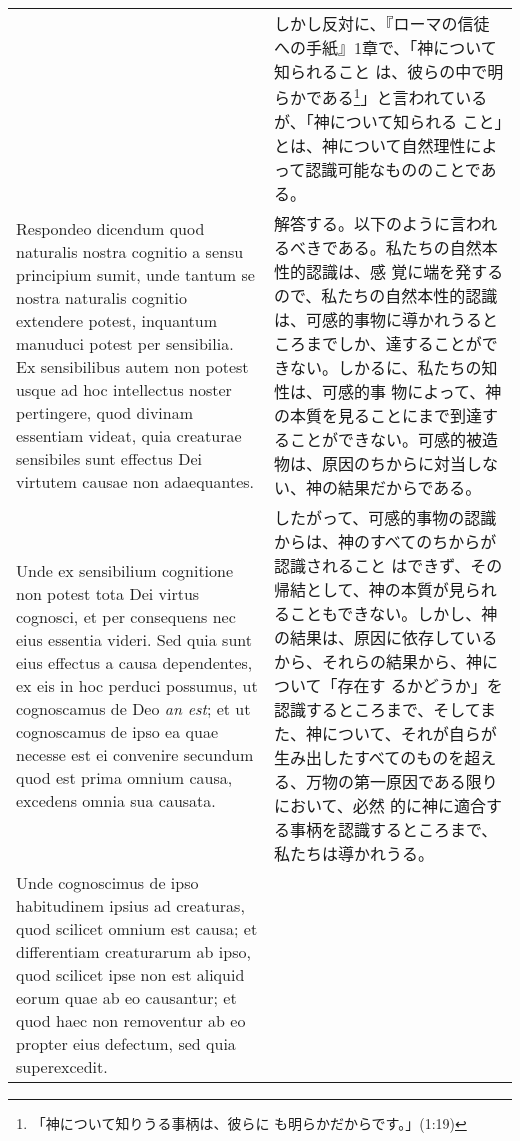 \documentclass[10pt]{jsarticle} %
\begin{document}
\begin{longtable}{p{21em}p{21em}}
&

しかし反対に、『ローマの信徒への手紙』1章で、「神について知られること
は、彼らの中で明らかである\footnote{「神について知りうる事柄は、彼らに
も明らかだからです。」(1:19)}」と言われているが、「神について知られる
こと」とは、神について自然理性によって認識可能なもののことである。

\\

{\sc Respondeo dicendum} quod naturalis nostra cognitio a sensu
principium sumit, unde tantum se nostra naturalis cognitio extendere
potest, inquantum manuduci potest per sensibilia. Ex sensibilibus
autem non potest usque ad hoc intellectus noster pertingere, quod
divinam essentiam videat, quia creaturae sensibiles sunt effectus Dei
virtutem causae non adaequantes. 

&

解答する。以下のように言われるべきである。私たちの自然本性的認識は、感
覚に端を発するので、私たちの自然本性的認識は、可感的事物に導かれうると
ころまでしか、達することができない。しかるに、私たちの知性は、可感的事
物によって、神の本質を見ることにまで到達することができない。可感的被造
物は、原因のちからに対当しない、神の結果だからである。

\\

Unde ex sensibilium cognitione non potest tota Dei virtus cognosci, et
per consequens nec eius essentia videri. Sed quia sunt eius effectus a
causa dependentes, ex eis in hoc perduci possumus, ut cognoscamus de
Deo {\it an est}; et ut cognoscamus de ipso ea quae necesse est ei
convenire secundum quod est prima omnium causa, excedens omnia sua
causata.

&

したがって、可感的事物の認識からは、神のすべてのちからが認識されること
はできず、その帰結として、神の本質が見られることもできない。しかし、神
の結果は、原因に依存しているから、それらの結果から、神について「存在す
るかどうか」を認識するところまで、そしてまた、神について、それが自らが
生み出したすべてのものを超える、万物の第一原因である限りにおいて、必然
的に神に適合する事柄を認識するところまで、私たちは導かれうる。

\\

Unde cognoscimus de ipso habitudinem ipsius ad creaturas, quod
scilicet omnium est causa; et differentiam creaturarum ab ipso, quod
scilicet ipse non est aliquid eorum quae ab eo causantur; et quod haec
non removentur ab eo propter eius defectum, sed quia superexcedit.


\end{longtable}
\end{document}
